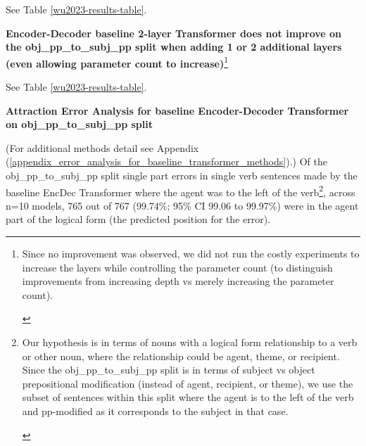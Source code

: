 \documentclass[11pt]{article}
\begin{document}
See Table \ref{wu2023-results-table}.

\textbf{\citep{Wu2023} Encoder-Decoder baseline 2-layer Transformer does not improve on the obj\_pp\_to\_subj\_pp split when adding 1 or 2 additional layers}
\label{wu-baseline-layer-variation-experiment-results}
\textbf{(even allowing parameter count to increase)}\footnote{\begin{footnotesize}
Since no improvement was observed, we did not run the costly experiments to increase the layers while controlling the parameter count (to distinguish improvements from increasing depth vs merely increasing the parameter count).
\end{footnotesize}
}

See Table \ref{wu2023-results-table}.

\textbf{Attraction Error Analysis for \citep{Wu2023} baseline Encoder-Decoder Transformer on obj\_pp\_to\_subj\_pp split}

(For additional methods detail see Appendix (\ref{appendix_error_analysis_for_baseline_transformer_methods}).) Of the obj\_pp\_to\_subj\_pp split single part errors in single verb sentences made by the \citep{Wu2023} baseline EncDec Transformer where the agent was to the left of the verb\footnote{\begin{footnotesize}Our hypothesis is in terms of nouns with a logical form relationship to a verb or other noun, where the relationship could be agent, theme, or recipient.
Since the obj\_pp\_to\_subj\_pp split is in terms of subject vs object prepositional modification (instead of agent, recipient, or theme), we use the subset of sentences within this split where the agent is to the left of the verb and pp-modified as it corresponds to the subject in that case.
\end{footnotesize}
}, 
across n=10 models, 765 out of 767 (99.74\%; 95\% CI 99.06 to 99.97\%) were in the agent part of the logical form (the predicted position for the error).
\end{document}
